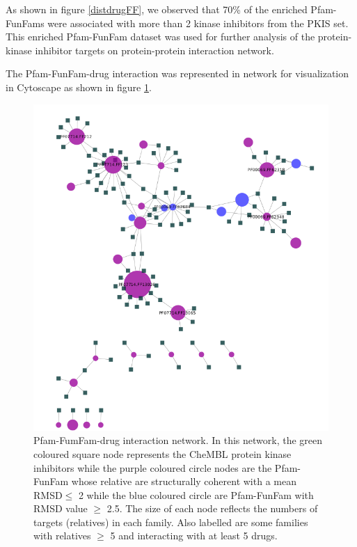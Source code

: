 \documentclass[a4paper, 11pt]{report}
\newcommand{\redcomment}[1]{\textcolor{red}{[#1]}} %
\begin{document}
As shown in figure \ref{distdrugFF}, we observed that 70\% of the enriched Pfam-FunFams were associated with more than 2 kinase inhibitors from the PKIS set. This enriched Pfam-FunFam dataset was used for further analysis of the protein-kinase inhibitor targets on protein-protein interaction network.\par
The Pfam-FunFam-drug interaction was represented in network for visualization in Cytoscape as shown in figure \ref{pfam-chembl}.
\begin{figure}[H]
	\includegraphics[width=\linewidth]{figures/pfam_chembl.png}
	\centering
	\caption{Pfam-FumFam-drug interaction network. In this network, the green coloured square node represents the CheMBL protein kinase inhibitors while the purple coloured circle nodes are the Pfam-FunFam whose relative are structurally coherent with a mean RMSD$\leq$ 2 while the blue coloured circle are Pfam-FunFam with RMSD value $\geq$ 2.5. The size of each node reflects the numbers of targets (relatives)
in each family. Also labelled are some families with relatives  $\geq$ 5 and interacting with at least 5 drugs.}
	\label{pfam-chembl}
\end{figure}
\end{document}
